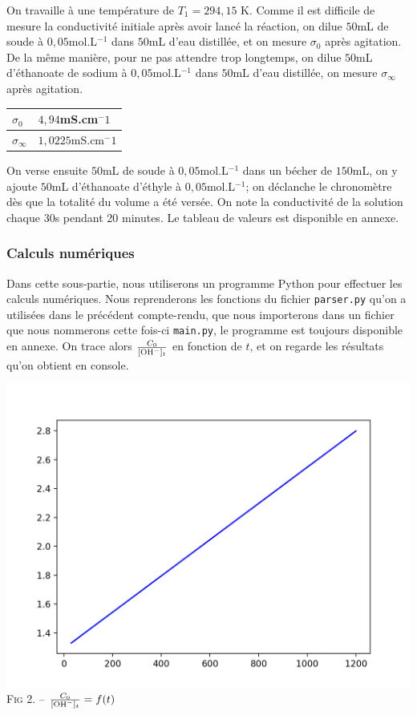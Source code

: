 \documentclass[14pt]{article}
\begin{document}
  On travaille à une température de $T_1=294,15$ K. Comme il est difficile de mesure la conductivité initiale après avoir lancé la réaction, on dilue $50$mL de soude à $0,05$mol.L$^{-1}$ dans $50$mL d'eau distillée, et on mesure $\sigma_0$ après agitation. De la même manière, pour ne pas attendre trop longtemps, on dilue $50$mL d'éthanoate de sodium à $0,05$mol.L$^{-1}$ dans $50$mL d'eau distillée, on mesure $\sigma_\infty$ après agitation.
  \begin{center}
    \begin{tabular}{| p{1.2cm} | p{3cm} |}
    \hline
    $\sigma_0$ & $4,94$mS.cm$^-1$\\
    \hline
    $\sigma_\infty$ & $1,0225$mS.cm$^-1$ \\
    \hline
    \end{tabular}
  \end{center}

  On verse ensuite $50$mL de soude à $0,05$mol.L$^{-1}$ dans un bécher de $150$mL, on y ajoute $50$mL d'éthanoate d'éthyle à $0,05$mol.L$^{-1}$; on déclanche le chronomètre dès que la totalité du volume a été versée. On note la conductivité de la solution chaque $30$s pendant 20 minutes. Le tableau de valeurs est disponible en annexe. \\

  \subsubsection*{Calculs numériques}
  Dans cette sous-partie, nous utiliserons un programme Python pour effectuer les calculs numériques. Nous reprenderons les fonctions du fichier \texttt{parser.py} qu'on a utilisées dans le précédent compte-rendu, que nous importerons dans un fichier que nous nommerons cette fois-ci \texttt{main.py}, le programme est toujours disponible en annexe. On trace alors $\frac{C_0}{[\text{OH}^-]_t}$ en fonction de $t$, et on regarde les résultats qu'on obtient en console.
  \begin{center}
    \includegraphics[scale=0.6]{./regg1.png}\\
    \textsc{Fig 2.} – $\frac{C_0}{[\text{OH}^-]_t}=f(t)$
  \end{center}
\end{document}
